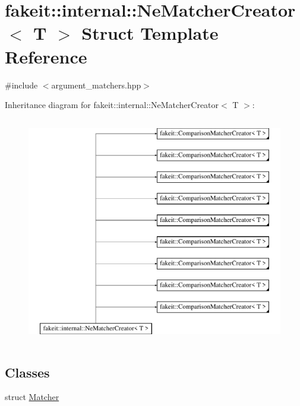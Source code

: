 \hypertarget{structfakeit_1_1internal_1_1NeMatcherCreator}{}\section{fakeit\+::internal\+::Ne\+Matcher\+Creator$<$ T $>$ Struct Template Reference}
\label{structfakeit_1_1internal_1_1NeMatcherCreator}


{\ttfamily \#include $<$argument\+\_\+matchers.\+hpp$>$}

Inheritance diagram for fakeit\+::internal\+::Ne\+Matcher\+Creator$<$ T $>$\+:\begin{figure}[H]
\begin{center}
\leavevmode
\includegraphics[height=10.000000cm]{structfakeit_1_1internal_1_1NeMatcherCreator}
\end{center}
\end{figure}
\subsection*{Classes}
\begin{DoxyCompactItemize}
\item 
struct \mbox{\hyperlink{structfakeit_1_1internal_1_1NeMatcherCreator_1_1Matcher}{Matcher}}
\end{DoxyCompactItemize}
